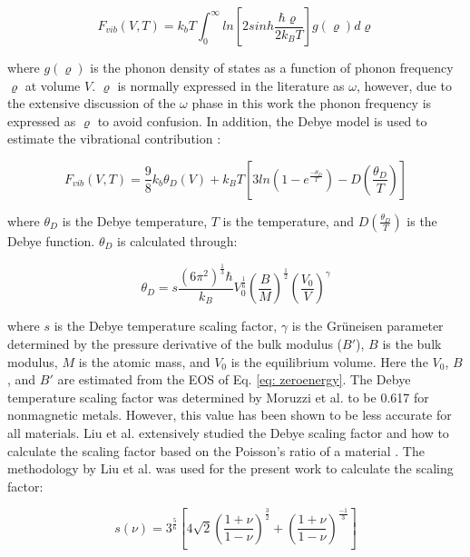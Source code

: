 \begin{equation}
\label{eq: phonon}
F_{vib}(V,T) = k_{b}T \int_{0}^{\infty} ln \left[ 2sinh \frac{\hbar \varrho}{2k_BT} \right] g(\varrho) d\varrho
\end{equation}

\noindent where $g(\varrho)$ is the phonon density of states as a function of phonon frequency $\varrho$ at volume $V$. $\varrho$ is normally expressed in the literature as $\omega$, however, due to the extensive discussion of the $\omega$ phase in this work the phonon frequency is expressed as $\varrho$ to avoid confusion. In addition, the Debye model is used to estimate the vibrational contribution \cite{Shang2010}: 

\begin{equation}
\label{eq: debye}
F_{vib}(V,T) = \frac{9}{8} k_{b} \theta_{D}(V) + k_{B}T \left[ 3 ln \left( 1 - e^{\frac{-\theta_{D}}{T}} \right) - D \left( \frac{\theta_D}{T} \right) \right] 
\end{equation}

\noindent where $\theta_{D}$ is the Debye temperature, $T$ is the temperature, and $D \left( \frac{\theta_{D}}{T} \right) $ is the Debye function. $\theta_{D}$ is calculated through: 

\begin{equation}
\label{eq: debyetemp}
\theta_{D} = s \frac{(6\pi^2)^{\frac{1}{3}}\hbar}{k_B} V_{0}^{\frac{1}{6}} \left( \frac{B}{M} \right)^{\frac{1}{2}} \left( \frac{V_0}{V} \right)^{\gamma} 
\end{equation}

\noindent where $s$ is the Debye temperature scaling factor, $\gamma$ is the Gr\"uneisen parameter determined by the pressure derivative of the bulk modulus ($B'$), $B$ is the bulk modulus, $M$ is the atomic mass, and $V_0$ is the equilibrium volume. Here the $V_0$, $B$, and $B'$ are estimated from the EOS of Eq. \ref{eq: zeroenergy}. The Debye temperature scaling factor was determined by Moruzzi et al. \cite{Moruzzi1988} to be 0.617 for nonmagnetic metals. However, this value has been shown to be less accurate for all materials. Liu et al. extensively studied the Debye scaling factor and how to calculate the scaling factor based on the Poisson's ratio of a material \cite{Liu2015}. The methodology by Liu et al. \cite{Liu2015} was used for the present work to calculate the scaling factor: 

\begin{equation}
\label{eq: debyescaling}
s(\nu) = 3^{\frac{5}{6}} \left[ 4\sqrt{2} \left( \frac{1 + \nu}{1 - \nu} \right)^{\frac{3}{2}} + \left( \frac{1 + \nu}{1 - \nu} \right)^{\frac{-1}{3}} \right]
\end{equation}

